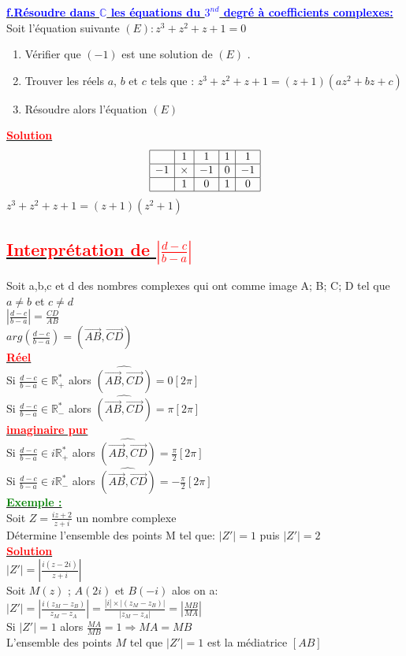 \documentclass[12pt]{article}
\newcounter{exemple} %
\newcommand{\exemple}{%
  \refstepcounter{exemple}%
  \textbf{\textcolor{green}{Exemple \theexemple :}} \ignorespaces
}
\begin{document}
\underline{\textbf{\textcolor{blue}{f.Résoudre dans $\mathbb{C}$ les équations du $3^{nd}$ degré à coefficients complexes:}}}\\
Soit l'équation suivante $(E):z^{3} + z^{2} + z + 1 = 0$ 
\begin{enumerate}
\item Vérifier que $(-1)$ est une solution de $(E)$ .
\item Trouver les réels $a$, $b$ et $c$ tels que : $z^{3} + z^{2} + z + 1 = ( z +1)(az^{2}+ bz + c)$
\item Résoudre alors l'équation $(E)$
\end{enumerate}
\underline{\textbf{\textcolor{red}{Solution}}}\\
\[
\begin{array}{|c|c|c|c|c|}
\hline
 & 1 & 1 & 1 & 1  \\ 
\hline
-1 & \times & -1 & 0 & -1 \\ 
\hline
 & 1 & 0 & 1 & 0  \\
\hline
\end{array}
\]
$z^{3} + z^{2} + z + 1 = ( z +1)(z^{2}+1)$
\subsection*{\underline{\textbf{\textcolor{red}{Interprétation de $|\frac{d-c}{b-a}|$}}}}
Soit a,b,c et d des nombres complexes qui ont comme image A; B; C; D tel que $a \neq b$ et $c \neq d$\\
$|\frac{d-c}{b-a}|=\frac{CD}{AB}$\\
$arg(\frac{d-c}{b-a})=(\vec{AB},\vec{CD})$\\
\underline{\textbf{\textcolor{red}{Réel}}}\\
Si $\frac{d-c}{b-a} \in \mathbb{R}^{*}_{+}$ alors $\widehat{(\vec{AB},\vec{CD})}=0 [2\pi]$\\ 
Si $\frac{d-c}{b-a} \in \mathbb{R}^{*}_{-}$ alors $\widehat{(\vec{AB},\vec{CD})}=\pi [2\pi]$\\
\underline{\textbf{\textcolor{red}{imaginaire pur}}}\\
Si $\frac{d-c}{b-a} \in i\mathbb{R}^{*}_{+}$ alors $\widehat{(\vec{AB},\vec{CD})}=\frac{\pi}{2} [2\pi]$\\ 
Si $\frac{d-c}{b-a} \in i\mathbb{R}^{*}_{-}$ alors $\widehat{(\vec{AB},\vec{CD})}=-\frac{\pi}{2} [2\pi]$\\
\underline{\exemple}\\
Soit $Z=\frac{iz+2}{z+i}$ un nombre complexe\\
Détermine l'ensemble des points M tel que: $|Z'|=1$ puis $|Z'|=2$\\
\underline{\textbf{\textcolor{red}{Solution}}}\\
$|Z'|=|\frac{i(z-2i)}{z+i}|$\\
Soit $M(z)$ ; $A(2i)$ et $B(-i)$ alos on a:\\
$|Z'|=|\frac{i(z_{M}-z_{B})}{z_{M}-z_{A}}|=\frac{|i|\times|(z_{M}-z_{B})|}{|z_{M}-z_{A}|}=\left| \frac{MB}{MA}\right| $\\
Si $|Z'|=1$ alors $\frac{MA}{MB}=1 \Longrightarrow MA=MB$\\
L'ensemble des points $M$ tel que  $|Z'|=1$ est la médiatrice $[AB]$\\
\end{document}
